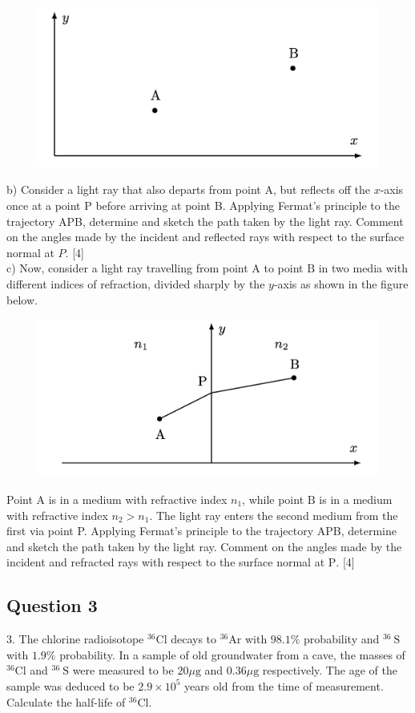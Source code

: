\documentclass{article}
\begin{document}
\begin{figure}
	\centering
	\includegraphics[width=0.5\linewidth]{spho_book_TYS_images/2017q2.png}
	\caption{}
\end{figure}
b) Consider a light ray that also departs from point $\mathrm{A}$, but reflects off the $x$-axis once at a point P before arriving at point B. Applying Fermat's principle to the trajectory APB, determine and sketch the path taken by the light ray. Comment on the angles made by the incident and reflected rays with respect to the surface normal at $P$. [4] \\
c) Now, consider a light ray travelling from point $\mathrm{A}$ to point $\mathrm{B}$ in two media with different indices of refraction, divided sharply by the $y$-axis as shown in the figure below. \\
\begin{figure}
	\centering
	\includegraphics[width=0.5\linewidth]{spho_book_TYS_images/2017q2_2.png}
	\caption{}
\end{figure}
Point $\mathrm{A}$ is in a medium with refractive index $n_{1}$, while point $\mathrm{B}$ is in a medium with refractive index $n_{2}>n_{1}$. The light ray enters the second medium from the first via point P. Applying Fermat's principle to the trajectory APB, determine and sketch the path taken by the light ray. Comment on the angles made by the incident and refracted rays with respect to the surface normal at $\mathrm{P}$. [4]

\subsection{Question 3}
3. The chlorine radioisotope ${ }^{36} \mathrm{Cl}$ decays to ${ }^{36} \mathrm{Ar}$ with $98.1 \%$ probability and ${ }^{36} \mathrm{~S}$ with $1.9 \%$ probability. In a sample of old groundwater from a cave, the masses of ${ }^{36} \mathrm{Cl}$ and ${ }^{36} \mathrm{~S}$ were measured to be $20 \mu \mathrm{g}$ and $0.36 \mu \mathrm{g}$ respectively. The age of the sample was deduced to be $2.9 \times 10^{5}$ years old from the time of measurement. Calculate the half-life of ${ }^{36} \mathrm{Cl}$.
\end{document}
